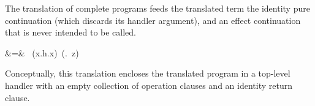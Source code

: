 \documentclass[12pt,phd,lfcs,twoside,openright,logo,leftchapter,normalheadings]{infthesis}
\theoremstyle{plain}
\theoremstyle{definition}
\begin{document}
The translation of complete programs feeds the translated term the
identity pure continuation (which discards its handler argument), and
an effect continuation that is never intended to be called.
%
\begin{equations}
 &=& ~(\lambda x.\lambda h.x)~(\lambda {}.\Absurd~z) \\
\end{equations}
%
Conceptually, this translation encloses the translated program in a
top-level handler with an empty collection of operation clauses and an
identity return clause.




\end{document}
